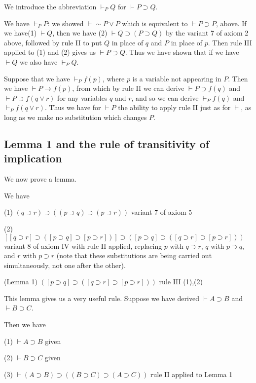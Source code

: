 \documentclass[12pt]{article}
\begin{document}
We introduce the abbreviation $\vdash_P Q$ for $\vdash P \supset Q$.

We have $\vdash_P P$:  we showed $\vdash \sim P \vee P$ which is equivalent to $\vdash P \supset P$, above.
If we have(1)  $\vdash Q$, then we have (2) $\vdash Q \supset (P \supset Q)$ by the variant 7 of axiom 2 above, followed by rule II to put $Q$ in place of $q$ and $P$ in place of $p$.
Then rule III applied to (1) and (2) gives us $\vdash P \supset Q$.  Thus we have shown that if we have $\vdash Q$ we also have $\vdash_P Q$.

Suppose that we have $\vdash_P f(p)$, where $p$ is a variable not appearing in $P$.  Then we have $\vdash P \rightarrow f(p)$, from which by rule II we can derive $\vdash P \supset f(q)$ and $\vdash P\supset f(q \vee r)$ for any variables $q$ and $r$, and so we can derive $\vdash_P f(q)$ and $\vdash_P f(q \vee r)$.  Thus we have for $\vdash P$ the ability to apply rule II just as for $\vdash$, as long as we make no substitution which changes $P$.

\subsection {Lemma 1 and the rule of transitivity of implication}

We now prove a lemma.

We have

(1) $( q \supset r) \supset ((p \supset q) \supset (p \supset r))$  variant 7 of axiom 5

(2)  $[[q \supset r] \supset ([p \supset q] \supset  [p \supset r])] \supset ([p \supset q] \supset  ([q \supset r] \supset [p \supset r]))$  variant 8 of axiom IV with rule II
applied, replacing $p$ with $q \supset r$, $q$ with $p \supset q$, and $r$ with $p \supset r$ (note that these substitutions are being carried out simultaneously, not one after the other).

(Lemma 1)  $([p \supset q] \supset  ([q \supset r] \supset [p \supset r]))$  rule III (1),(2)

This lemma gives us a very useful rule.  Suppose we have derived $\vdash A \supset B$ and $\vdash B \supset C$.

Then we have

(1) $\vdash A \supset B$  given

(2) $\vdash B \supset C$ given

(3) $\vdash (A \supset B) \supset ((B \supset C) \supset (A \supset C))$  rule II applied to Lemma 1
\end{document}
